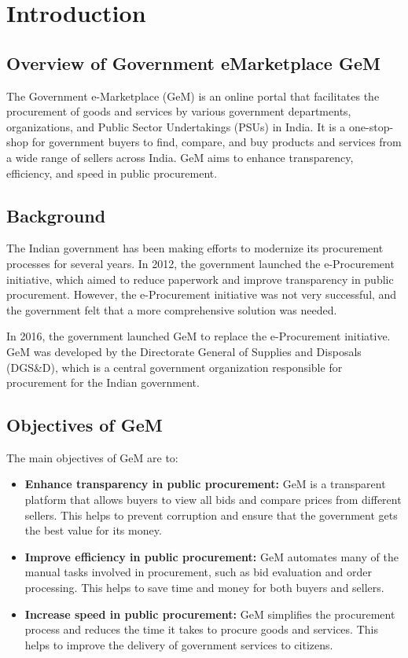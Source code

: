 \setcounter{page}{1}
\section{Introduction}

\subsection{Overview of Government eMarketplace GeM}


The Government e-Marketplace (GeM) is an online portal that facilitates the procurement of goods and services by various government departments, organizations, and Public Sector Undertakings (PSUs) in India. It is a one-stop-shop for government buyers to find, compare, and buy products and services from a wide range of sellers across India. GeM aims to enhance transparency, efficiency, and speed in public procurement.

\subsection{Background}

The Indian government has been making efforts to modernize its procurement processes for several years. In 2012, the government launched the e-Procurement initiative, which aimed to reduce paperwork and improve transparency in public procurement. However, the e-Procurement initiative was not very successful, and the government felt that a more comprehensive solution was needed.

In 2016, the government launched GeM to replace the e-Procurement initiative. GeM was developed by the Directorate General of Supplies and Disposals (DGS\&D), which is a central government organization responsible for procurement for the Indian government.

\subsection{Objectives of GeM}

The main objectives of GeM are to:

\begin{itemize}
    \item \textbf{Enhance transparency in public procurement:} GeM is a transparent platform that allows buyers to view all bids and compare prices from different sellers. This helps to prevent corruption and ensure that the government gets the best value for its money.
    \item \textbf{Improve efficiency in public procurement:} GeM automates many of the manual tasks involved in procurement, such as bid evaluation and order processing. This helps to save time and money for both buyers and sellers.
    \item \textbf{Increase speed in public procurement:} GeM simplifies the procurement process and reduces the time it takes to procure goods and services. This helps to improve the delivery of government services to citizens.
\end{itemize}

